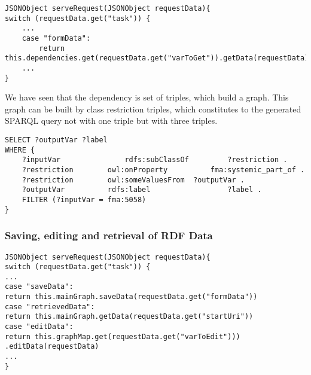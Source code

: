 
\begin{lstlisting}[basicstyle=\footnotesize, frame=single, caption={Loading form data from FormConfiguration}, label=serveRequest, captionpos=b, belowskip=1em, aboveskip=2em]
JSONObject serveRequest(JSONObject requestData){
switch (requestData.get("task")) {
	...
	case "formData": 
		return this.dependencies.get(requestData.get("varToGet")).getData(requestData)
	...		
}
\end{lstlisting}


We have seen that the dependency is set of triples, which build a graph. This graph can be built by class restriction triples, which constitutes to the generated SPARQL query not with one triple but with three triples.


\begin{lstlisting}[basicstyle=\footnotesize, frame=single, caption={SPARQL query generated by class restriction triple}, label=JS_subFormRoutine, captionpos=b, belowskip=1em, aboveskip=2em]
SELECT ?outputVar ?label 
WHERE {
	?inputVar				rdfs:subClassOf			?restriction .
	?restriction		owl:onProperty			fma:systemic_part_of .
	?restriction		owl:someValuesFrom	?outputVar .
	?outputVar			rdfs:label					?label .	
	FILTER (?inputVar = fma:5058)
}
\end{lstlisting}


\subsubsection{Saving, editing and retrieval of RDF Data}





\begin{lstlisting}[basicstyle=\footnotesize, frame=single, caption={Loading form data from FormConfiguration}, label=serveRequest, captionpos=b, belowskip=1em, aboveskip=2em]
JSONObject serveRequest(JSONObject requestData){
switch (requestData.get("task")) {
...
case "saveData": 
return this.mainGraph.saveData(requestData.get("formData"))
case "retrievedData": 
return this.mainGraph.getData(requestData.get("startUri"))
case "editData": 
return this.graphMap.get(requestData.get("varToEdit")))
.editData(requestData)
...		
}
\end{lstlisting}
